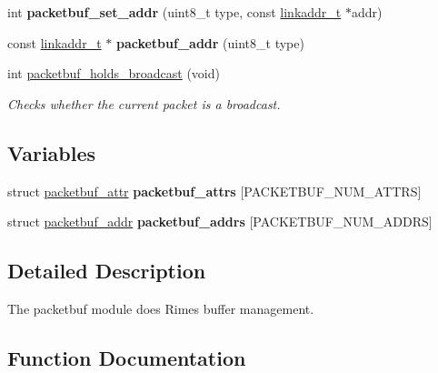\begin{DoxyCompactItemize}
\item 
\hypertarget{group__packetbuf_ga56d82959356e056070affda88365c3cb}{}int {\bfseries packetbuf\+\_\+set\+\_\+addr} (uint8\+\_\+t type, const \hyperlink{unionlinkaddr__t}{linkaddr\+\_\+t} $\ast$addr)\label{group__packetbuf_ga56d82959356e056070affda88365c3cb}

\item 
\hypertarget{group__packetbuf_ga4f1ab76f775cfd566822fdfa69431646}{}const \hyperlink{unionlinkaddr__t}{linkaddr\+\_\+t} $\ast$ {\bfseries packetbuf\+\_\+addr} (uint8\+\_\+t type)\label{group__packetbuf_ga4f1ab76f775cfd566822fdfa69431646}

\item 
int \hyperlink{group__packetbuf_gaace1fdbc02444a06c58aa379b44111aa}{packetbuf\+\_\+holds\+\_\+broadcast} (void)
\begin{DoxyCompactList}\small\item\em Checks whether the current packet is a broadcast. \end{DoxyCompactList}\end{DoxyCompactItemize}
\subsection*{Variables}
\begin{DoxyCompactItemize}
\item 
\hypertarget{group__packetbuf_gabb318b0452c06e571fa0c4bc553684a7}{}struct \hyperlink{structpacketbuf__attr}{packetbuf\+\_\+attr} {\bfseries packetbuf\+\_\+attrs} \mbox{[}P\+A\+C\+K\+E\+T\+B\+U\+F\+\_\+\+N\+U\+M\+\_\+\+A\+T\+T\+R\+S\mbox{]}\label{group__packetbuf_gabb318b0452c06e571fa0c4bc553684a7}

\item 
\hypertarget{group__packetbuf_gacd204773e0cf2d1fbfe6b8e0d4d25c2e}{}struct \hyperlink{structpacketbuf__addr}{packetbuf\+\_\+addr} {\bfseries packetbuf\+\_\+addrs} \mbox{[}P\+A\+C\+K\+E\+T\+B\+U\+F\+\_\+\+N\+U\+M\+\_\+\+A\+D\+D\+R\+S\mbox{]}\label{group__packetbuf_gacd204773e0cf2d1fbfe6b8e0d4d25c2e}

\end{DoxyCompactItemize}


\subsection{Detailed Description}
The packetbuf module does Rime\textquotesingle{}s buffer management. 

\subsection{Function Documentation}
\hypertarget{group__packetbuf_gaa540c9abf0db13d27881b616f7794824}{}
